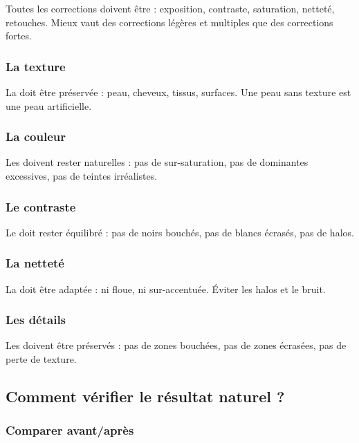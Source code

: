 Toutes les corrections doivent être  : exposition, contraste, saturation, netteté, retouches. Mieux vaut des corrections légères et multiples que des corrections fortes.

\subsubsection{La texture}

La  doit être préservée : peau, cheveux, tissus, surfaces. Une peau sans texture est une peau artificielle.

\subsubsection{La couleur}

Les  doivent rester naturelles : pas de sur-saturation, pas de dominantes excessives, pas de teintes irréalistes.

\subsubsection{Le contraste}

Le  doit rester équilibré : pas de noirs bouchés, pas de blancs écrasés, pas de halos.

\subsubsection{La netteté}

La  doit être adaptée : ni floue, ni sur-accentuée. Éviter les halos et le bruit.

\subsubsection{Les détails}

Les  doivent être préservés : pas de zones bouchées, pas de zones écrasées, pas de perte de texture.

\subsection{Comment vérifier le résultat naturel ?}

\subsubsection{Comparer avant/après}

